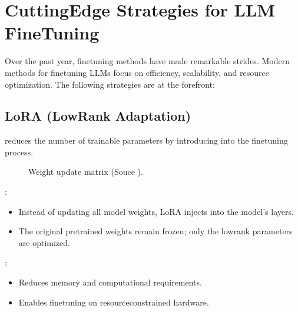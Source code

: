 \documentclass[letterpaper,11pt,english]{sphinxmanual}
\begin{document}
\section{Cutting\sphinxhyphen{}Edge Strategies for LLM Fine\sphinxhyphen{}Tuning}
\label{\detokenize{finetuning:cutting-edge-strategies-for-llm-fine-tuning}}
\sphinxAtStartPar
Over the past year, fine\sphinxhyphen{}tuning methods have made remarkable strides. Modern methods
for fine\sphinxhyphen{}tuning LLMs focus on efficiency, scalability, and resource optimization.
The following strategies are at the forefront:


\subsection{LoRA (Low\sphinxhyphen{}Rank Adaptation)}
\label{\detokenize{finetuning:lora-low-rank-adaptation}}
\sphinxAtStartPar
{} reduces the number of trainable parameters by introducing  into the fine\sphinxhyphen{}tuning process.

\begin{figure}[htbp]
\centering
\capstart

\noindent{}
\caption{Weight update matrix (Souce ).}\label{\detokenize{finetuning:id10}}\label{\detokenize{finetuning:fig-lora}}\end{figure}

\sphinxAtStartPar
{}:
\begin{itemize}
\item {} 
\sphinxAtStartPar
Instead of updating all model weights, LoRA injects  into the model’s layers.

\item {} 
\sphinxAtStartPar
The original pre\sphinxhyphen{}trained weights remain frozen; only the low\sphinxhyphen{}rank parameters are optimized.

\end{itemize}

\sphinxAtStartPar
{}:
\begin{itemize}
\item {} 
\sphinxAtStartPar
Reduces memory and computational requirements.

\item {} 
\sphinxAtStartPar
Enables fine\sphinxhyphen{}tuning on resource\sphinxhyphen{}constrained hardware.

\end{itemize}
\end{document}
